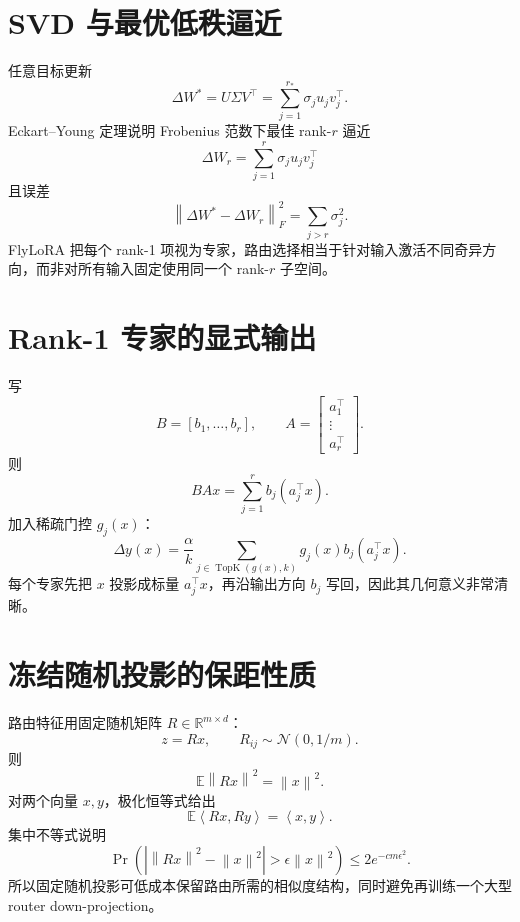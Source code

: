 \documentclass[UTF8,12pt,a4paper,fontset=none]{ctexart}
\numberwithin{equation}{section}
\newcommand{\R}{\mathbb{R}}
\newcommand{\E}{\mathbb{E}}
\newcommand{\norm}[1]{\left\lVert #1\right\rVert}
\newcommand{\ip}[2]{\left\langle #1,#2\right\rangle}
\begin{document}
\section{SVD 与最优低秩逼近}
任意目标更新
\begin{equation}
 \Delta W^*=U\Sigma V^\top
 =\sum_{j=1}^{r_*}\sigma_ju_jv_j^\top.
\end{equation}
Eckart--Young 定理说明 Frobenius 范数下最佳 rank-$r$ 逼近
\begin{equation}
 \Delta W_r=\sum_{j=1}^{r}\sigma_ju_jv_j^\top
\end{equation}
且误差
\begin{equation}
 \norm{\Delta W^*-\Delta W_r}_F^2
 =\sum_{j>r}\sigma_j^2.
\end{equation}
FlyLoRA 把每个 rank-1 项视为专家，路由选择相当于针对输入激活不同奇异方向，而非对所有输入固定使用同一个 rank-$r$ 子空间。

\section{Rank-1 专家的显式输出}
写
\begin{equation}
 B=[b_1,\ldots,b_r],
 \qquad A=\begin{bmatrix}a_1^\top\\\vdots\\a_r^\top\end{bmatrix}.
\end{equation}
则
\begin{equation}
 BAx=\sum_{j=1}^{r}b_j(a_j^\top x).
\end{equation}
加入稀疏门控 $g_j(x)$：
\begin{equation}
 \boxed{
 \Delta y(x)=\frac\alpha k
 \sum_{j\in\operatorname{TopK}(g(x),k)}g_j(x)b_j(a_j^\top x).
 }
\end{equation}
每个专家先把 $x$ 投影成标量 $a_j^\top x$，再沿输出方向 $b_j$ 写回，因此其几何意义非常清晰。

\section{冻结随机投影的保距性质}
路由特征用固定随机矩阵 $R\in\R^{m\times d}$：
\begin{equation}
 z=Rx,
 \qquad R_{ij}\sim\mathcal N(0,1/m).
\end{equation}
则
\begin{equation}
 \E\norm{Rx}^2=\norm{x}^2.
\end{equation}
对两个向量 $x,y$，极化恒等式给出
\begin{equation}
 \E\ip{Rx}{Ry}=\ip{x}{y}.
\end{equation}
集中不等式说明
\begin{equation}
 \Pr\left(|\norm{Rx}^2-\norm{x}^2|>\epsilon\norm{x}^2\right)
 \le2e^{-cm\epsilon^2}.
\end{equation}
所以固定随机投影可低成本保留路由所需的相似度结构，同时避免再训练一个大型 router down-projection。
\end{document}
